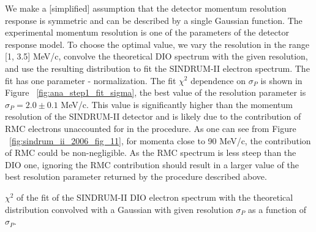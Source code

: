 We make a [simplified] assumption that the detector momentum resolution response
is symmetric and can be described by a single Gaussian function. 
The experimental momentum resolution is one of the parameters of the detector response model.
To choose the optimal value, we vary the resolution in the range [1, 3.5] MeV/c, convolve the
theoretical DIO spectrum with the given resolution, and use the resulting distribution to fit
the SINDRUM-II electron spectrum. The fit has one parameter - normalization. The fit $\chi^2$ dependence
on $\sigma_P$ is shown in Figure ~\ref{fig:ana_step1_fit_sigma}, the best value of the resolution
parameter is $\sigma_P = 2.0 \pm 0.1$ MeV/c. This value is significantly higher than the momentum
resolution of the SINDRUM-II detector and is likely due to the contribution of RMC electrons
unaccounted for in the procedure. As one can see from Figure ~\ref{fig:sindrum_ii_2006_fig_11},
for momenta close to 90 MeV/c, the contribution of RMC could be non-negligible. As the RMC spectrum
is less steep than the DIO one, ignoring the RMC contribution should result in a larger value of the
best resolution parameter returned by the procedure described above.

\vspace{0.2in}
%
 {
  \label{fig:ana_step1_fit_sigma}
  $\chi^2$ of the fit of the SINDRUM-II DIO electron spectrum with the theoretical distribution
  convolved with a Gaussian with given resolution $\sigma_P$ as a function of $\sigma_P$.
}
\vspace{0.2in}

